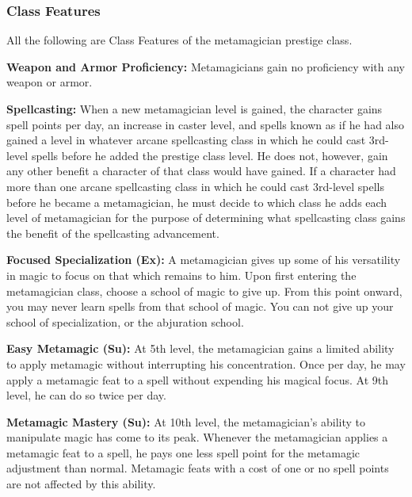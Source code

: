 \subsubsection{Class Features}
All the following are Class Features of the metamagician prestige class.

\textbf{Weapon and Armor Proficiency:} Metamagicians gain no proficiency with any weapon or armor.

\textbf{Spellcasting:} When a new metamagician level is gained, 
the character gains spell points per day, an increase in caster level, and spells known
as if he had also gained a level in whatever arcane spellcasting class in which he could cast 3rd-level spells before he added the prestige class level. 
He does not, however, gain any other benefit a character of that class would have gained. 
If a character had more than one arcane spellcasting class in which he could cast 3rd-level spells before he became a metamagician, 
he must decide to which class he adds each level of metamagician for the purpose of determining what spellcasting class gains the benefit of the spellcasting advancement.

\textbf{Focused Specialization (Ex):}
A metamagician gives up some of his versatility in magic to focus on that which remains to him.
Upon first entering the metamagician class, choose a school of magic to give up.
From this point onward, you may never learn spells from that school of magic.
You can not give up your school of specialization, or the abjuration school.

\textbf{Easy Metamagic (Su):}
At 5th level, the metamagician gains a limited ability to apply metamagic without interrupting his concentration.
Once per day, he may apply a metamagic feat to a spell without expending his magical focus.
At 9th level, he can do so twice per day.

\textbf{Metamagic Mastery (Su):}
At 10th level, the metamagician's ability to manipulate magic has come to its peak.
Whenever the metamagician applies a metamagic feat to a spell, he pays one less spell point for the metamagic adjustment than normal.
Metamagic feats with a cost of one or no spell points are not affected by this ability.